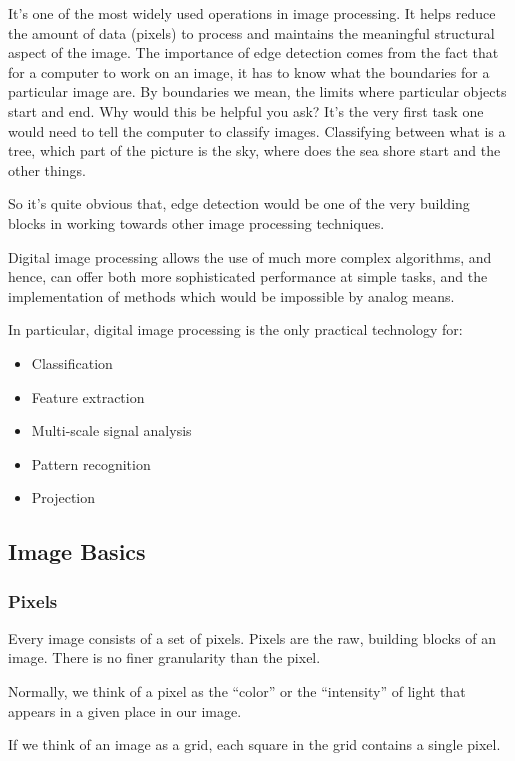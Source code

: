 \documentclass[BTech]{srmuthesis}
\begin{document}
\newpage

It's one of the most widely used operations
in image processing. It helps reduce the amount of data
(pixels) to process and maintains the meaningful structural
aspect of the image. The importance of edge detection comes from the fact that for a computer to work on an image, it has to know what the boundaries for a particular image are. By boundaries we mean, the limits where particular objects start and end. Why would this be helpful you ask? It's the very first task one would need to tell the computer to classify images. Classifying between what is a tree, which part of the picture is the sky, where does the sea shore start and the other things.

So it's quite obvious that, edge detection would be one of the very building blocks in working towards other image processing techniques. 

Digital image processing allows the use of much more complex algorithms, and hence, can offer both more sophisticated performance at simple tasks, and the implementation of methods which would be impossible by analog means.

In particular, digital image processing is the only practical technology for:

\begin{itemize}
    \item Classification
    \item Feature extraction
    \item Multi-scale signal analysis
    \item Pattern recognition
    \item Projection
\end{itemize}

\subsection{Image Basics}

\subsubsection{Pixels}

Every image consists of a set of pixels. Pixels are the raw, building blocks of an image. There is no finer granularity than the pixel.

Normally, we think of a pixel as the “color” or the “intensity” of light that appears in a given place in our image.

If we think of an image as a grid, each square in the grid contains a single pixel.
\end{document}
